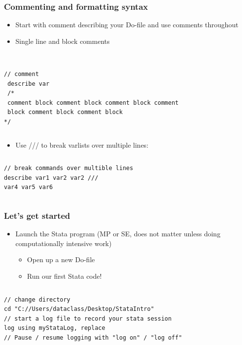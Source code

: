 \documentclass[table]{beamer}
\begin{document}
\begin{frame}[fragile]
\frametitle{Commenting and formatting syntax}
\label{sec-1-9}

\begin{itemize}
\item Start with comment describing your Do-file and use comments throughout
\item Single line and block comments
\end{itemize}
\vspace{-.5em} \begin{columns}  \begin{block}{}

\begin{verbatim}

// comment
 describe var
 /*
 comment block comment block comment block comment
 block comment block comment block 
*/
\end{verbatim}
\end{block} \end{columns}

\begin{itemize}
\item Use /// to break varlists over multiple lines:
\end{itemize}
\vspace{-.5em} \begin{columns}  \begin{block}{}

\begin{verbatim}
// break commands over multible lines
describe var1 var2 var2 ///
var4 var5 var6
\end{verbatim}
\end{block} \end{columns}
\end{frame}
\begin{frame}[fragile]
\frametitle{Let's get started}
\label{sec-1-10}

\begin{itemize}
\item Launch the Stata program (MP or SE, does not matter unless doing computationally intensive work)
\begin{itemize}
\item Open up a new Do-file
\item Run our first Stata code!
\end{itemize}
\end{itemize}
 
\vspace{-.5em} \begin{columns}  \begin{block}{}

\begin{verbatim}
// change directory
cd "C://Users/dataclass/Desktop/StataIntro"
// start a log file to record your stata session
log using myStataLog, replace
// Pause / resume logging with "log on" / "log off"
\end{verbatim}
\end{block} \end{columns}
\end{frame}
\end{document}
